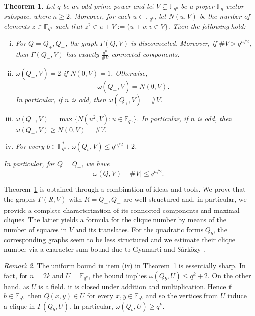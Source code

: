 \documentclass[11pt]{amsart}
\newcommand{\G}{\Gamma}
\newcommand{\F}{\mathbb F}
\newtheorem{theorem}{Theorem}[section]
\theoremstyle{definition}
\theoremstyle{remark}
\newtheorem{remark}[theorem]{Remark}
\begin{document}
\begin{theorem}\label{thm:main}
Let $q$ be an odd prime power and let $V\subsetneq \F_{q^n}$ be a proper $\F_q$-vector subspace, where $n\ge 2$. Moreover, for each $u\in \F_{q^n}$, let $N(u, V)$ be the number of elements $z\in \F_{q^n}$ such that $z^2\in u+V:=\{u+v:v\in V\}$. Then the following hold:

\begin{enumerate}[(i)]
\item For $Q=Q_+, Q_-$, the graph $\Gamma(Q, V)$ is disconnected. Moreover, if $\# V>q^{n/2}$, then $\Gamma(Q_-, V)$ has exactly $\frac{q^n}{\# V}$ connected components.

\item $\omega(Q_+, V)=2$ if $N(0, V)=1$. Otherwise,  $$\omega(Q_+, V)=N(0, V).$$
In particular, if $n$ is odd, then $\omega(Q_+, V)=\# V$. 
    
    \item $\omega(Q_-, V)= \max\{N(u^2, V): u\in \F_{q^n}\}$. In particular, if $n$ is odd, then $\omega(Q_-, V)\ge N(0, V)=\# V$.
    

\item For every $b\in \F_{q^n}^*$, $\omega(Q_b, V)\le q^{n/2}+2$.
\end{enumerate}  
In particular, for $Q=Q_{\pm}$, we have 
\begin{equation}\label{eq:near}
    |\omega(Q, V)-\# V|\le q^{n/2}.
\end{equation}
\end{theorem}


 Theorem~\ref{thm:main} is obtained through a combination of ideas and tools. We prove that the graphs $\Gamma(R, V)$ with $R=Q_+, Q_-$ are well structured and, in particular, we provide a complete characterization of its connected components and maximal cliques. The latter yields a formula for the clique number by means of the number of squares in $V$ and its translates.  
    For the quadratic forms $Q_b$, the corresponding graphs seem to be less structured and we estimate their clique number via a character sum bound due to Gyamarti and Sárközy~\cite{GS}. 


\begin{remark}\label{rem:optimal}
    The uniform bound in item (iv) in Theorem~\ref{thm:main} is essentially sharp. In fact, for $n=2k$ and  $U=\F_{q^{k}}$, the bound implies $\omega(Q_b, U)\le q^k+2$. On the other hand, as $U$ is a field, it is closed under addition and multiplication. Hence if
    $b\in \F_{q^k}$, then $Q(x, y)\in U$ for every $x, y\in \F_{q^k}$ and so the vertices from $U$ induce a clique in $\G(Q_b, U)$. In particular,    $\omega(Q_b, U)\ge q^k$. 
\end{remark}
\end{document}
